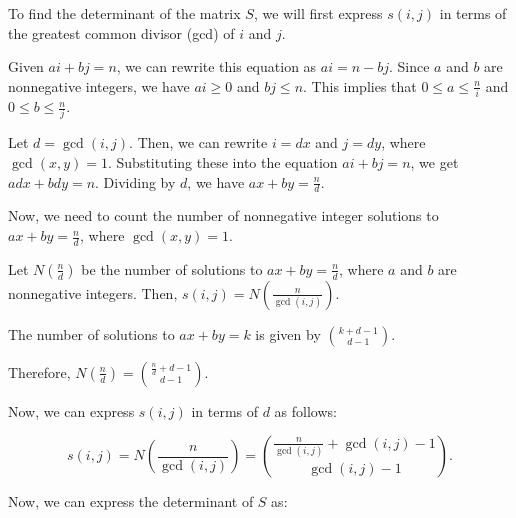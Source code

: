 To find the determinant of the matrix $S$, we will first express $s(i,j)$ in terms of the greatest common divisor (gcd) of $i$ and $j$.

Given $ai + bj = n$, we can rewrite this equation as $ai = n - bj$. Since $a$ and $b$ are nonnegative integers, we have $ai \geq 0$ and $bj \leq n$. This implies that $0 \leq a \leq \frac{n}{i}$ and $0 \leq b \leq \frac{n}{j}$.

Let $d = \gcd(i,j)$. Then, we can rewrite $i = dx$ and $j = dy$, where $\gcd(x,y) = 1$. Substituting these into the equation $ai + bj = n$, we get $adx + bdy = n$. Dividing by $d$, we have $ax + by = \frac{n}{d}$.

Now, we need to count the number of nonnegative integer solutions to $ax + by = \frac{n}{d}$, where $\gcd(x,y) = 1$.

Let $N(\frac{n}{d})$ be the number of solutions to $ax + by = \frac{n}{d}$, where $a$ and $b$ are nonnegative integers. Then, $s(i,j) = N(\frac{n}{\gcd(i,j)})$.

The number of solutions to $ax + by = k$ is given by $\binom{k+d-1}{d-1}$.

Therefore, $N(\frac{n}{d}) = \binom{\frac{n}{d}+d-1}{d-1}$.

Now, we can express $s(i,j)$ in terms of $d$ as follows:

$$s(i,j) = N\left(\frac{n}{\gcd(i,j)}\right) = \binom{\frac{n}{\gcd(i,j)}+\gcd(i,j)-1}{\gcd(i,j)-1}.$$

Now, we can express the determinant of $S$ as:

